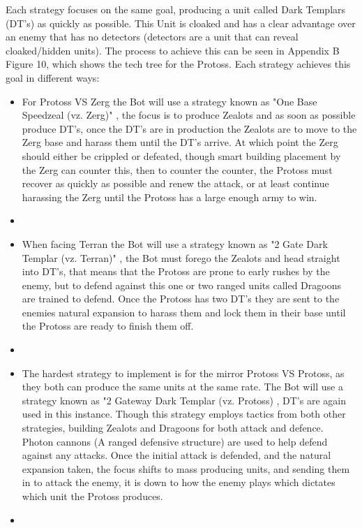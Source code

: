 \documentclass[journal]{IEEEtran}
\begin{document}
	Each strategy focuses on the same goal, producing a unit called Dark Templars (DT's) as quickly as possible. This Unit is cloaked and has a clear advantage over an enemy that has no detectors (detectors are a unit that can reveal cloaked/hidden units). The process to achieve this can be seen in Appendix B Figure 10, which shows the tech tree for the Protoss.
	Each strategy achieves this goal in different ways:
	
	\begin{itemize}
		\item For Protoss VS Zerg the Bot will use a strategy known as "One Base Speedzeal (vz. Zerg)" \cite{PVZ}, the focus is to produce Zealots and as soon as possible produce DT's, once the DT's are in production the Zealots are to move to the Zerg base and harass them until the DT's arrive. At which point the Zerg should either be crippled or defeated, though smart building placement by the Zerg can counter this, then to counter the counter, the Protoss must recover as quickly as possible and renew the attack, or at least continue harassing the Zerg until the Protoss has a large enough army to win.
		\item[]
		\item When facing Terran the Bot will use a strategy known as "2 Gate Dark Templar (vz. Terran)" \cite{PVT}, the Bot must forego the Zealots and head straight into DT's, that means that the Protoss are prone to early rushes by the enemy, but to defend against this one or two ranged units called Dragoons are trained to defend. Once the Protoss has two DT's they are sent to the enemies natural expansion to harass them and lock them in their base until the Protoss are ready to finish them off.
		\item[]
		\item The hardest strategy to implement is for the mirror Protoss VS Protoss, as they both can produce the same units at the same rate. The Bot will use a strategy known as "2 Gateway Dark Templar (vz. Protoss) \cite{PVP}, DT's are again used in this instance. Though this strategy employs tactics from both other strategies, building Zealots and Dragoons for both attack and defence. Photon cannons (A ranged defensive structure) are used to help defend against any attacks. Once the initial attack is defended, and the natural expansion taken, the focus shifts to mass producing units, and sending them in to attack the enemy, it is down to how the enemy plays which dictates which unit the Protoss produces.
		\item[]
	\end{itemize}
	
\end{document}
